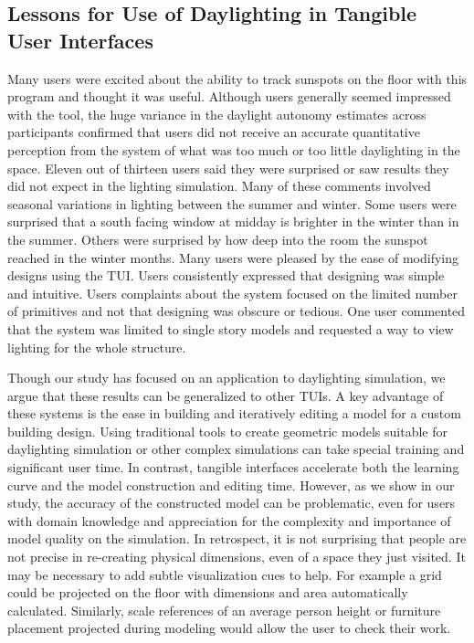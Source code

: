 \documentclass[preprint]{elsarticle}
\begin{document}
\subsection{Lessons for Use of Daylighting in Tangible User Interfaces}

Many users were excited about the ability to track sunspots on the
floor with this program and thought it was useful.  Although users
generally seemed impressed with the tool, the huge variance in the
daylight autonomy estimates across participants confirmed that users
did not receive an accurate quantitative perception from the system of
what was too much or too little daylighting in the space.
%
Eleven out of thirteen users said they were surprised or saw results
they did not expect in the lighting simulation.  Many of these
comments involved seasonal variations in lighting between the summer
and winter.  Some users were surprised that a south facing window at
midday is brighter in the winter than in the summer.  Others were
surprised by how deep into the room the sunspot reached in the winter
months.
%
Many users were pleased by the ease of modifying designs using the
TUI.  Users consistently expressed that designing was simple and
intuitive.  Users complaints about the system focused on the limited
number of primitives and not that designing was obscure or tedious.
One user commented that the system was limited to single story models
and requested a way to view lighting for the whole structure.


Though our study has focused on an application to daylighting
simulation, we argue that these results can be generalized to other
TUIs.  A key advantage of these systems is the ease in building and
iteratively editing a model for a custom building design.  Using
traditional tools to create geometric models suitable for daylighting
simulation or other complex simulations can take special training and
significant user time.  In contrast, tangible interfaces accelerate
both the learning curve and the model construction and editing time.
However, as we show in our study, the accuracy of the constructed
model can be problematic, even for users with domain knowledge and
appreciation for the complexity and importance of model quality on the
simulation.  
%
In retrospect, it is not surprising that people are not precise in
re-creating physical dimensions, even of a space they just visited.
It may be necessary to add subtle visualization cues to help.  For
example a grid could be projected on the floor with dimensions and
area automatically calculated.  Similarly, scale references of an
average person height or furniture placement projected during modeling
would allow the user to check their work.
\end{document}
